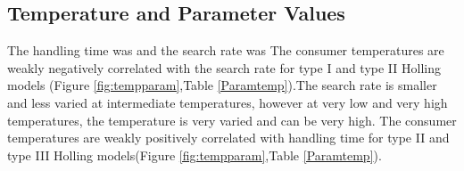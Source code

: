 \documentclass{article}
\begin{document}
\subsection{Temperature and Parameter Values}
The handling time was and the search rate was
The consumer temperatures are  weakly negatively correlated with the search rate for type I and type II Holling models (Figure \ref{fig:tempparam},Table \ref{Paramtemp}).The search rate is smaller and less varied at intermediate temperatures, however at very low and very high temperatures, the temperature is very varied and can be very high. The consumer temperatures are weakly positively correlated with handling time for type II and type III Holling models(Figure \ref{fig:tempparam},Table \ref{Paramtemp}).

\begin{figure}[h!t]
\centering
{}\\
 \\

\end{figure}
\end{document}
